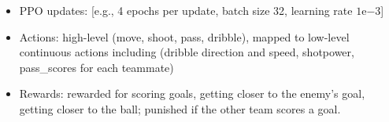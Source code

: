 \begin{itemize}
    \item PPO updates: [e.g., 4 epochs per update, batch size 32, learning rate $1\mathrm{e}{-3}$]
    \item Actions: high-level (move, shoot, pass, dribble), mapped to low-level continuous actions including (dribble direction and speed, shotpower, pass\_scores for each teammate)
    \item Rewards: rewarded for scoring goals, getting closer to the enemy's goal, getting closer to the ball; punished if the other team scores a goal.
\end{itemize}


